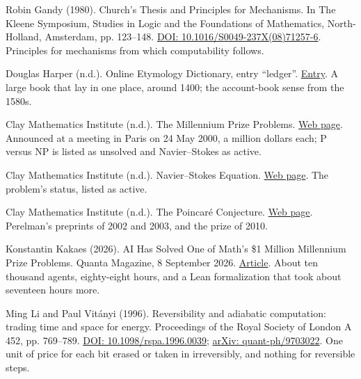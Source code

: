 \noindent Robin Gandy (1980). Church's Thesis and Principles for Mechanisms. In The Kleene Symposium, Studies in Logic and the Foundations of Mathematics, North-Holland, Amsterdam, pp. 123--148. \href{https://doi.org/10.1016/S0049-237X(08)71257-6}{DOI: 10.1016/S0049-237X(08)71257-6}. Principles for mechanisms from which computability follows.
\par\medskip

\noindent Douglas Harper (n.d.). Online Etymology Dictionary, entry ``ledger''. \href{https://www.etymonline.com/word/ledger}{Entry}. A large book that lay in one place, around 1400; the account-book sense from the 1580s.
\par\medskip

\noindent Clay Mathematics Institute (n.d.). The Millennium Prize Problems. \href{https://www.claymath.org/millennium-problems/}{Web page}. Announced at a meeting in Paris on 24 May 2000, a million dollars each; P versus NP is listed as unsolved and Navier--Stokes as active.
\par\medskip

\noindent Clay Mathematics Institute (n.d.). Navier--Stokes Equation. \href{https://www.claymath.org/millennium/navier-stokes-equation/}{Web page}. The problem's status, listed as active.
\par\medskip

\noindent Clay Mathematics Institute (n.d.). The Poincar\'e Conjecture. \href{https://www.claymath.org/millennium/poincare-conjecture/}{Web page}. Perelman's preprints of 2002 and 2003, and the prize of 2010.
\par\medskip

\noindent Konstantin Kakaes (2026). AI Has Solved One of Math's \$1 Million Millennium Prize Problems. Quanta Magazine, 8 September 2026. \href{https://www.quantamagazine.org/ai-has-solved-one-of-maths-1-million-millennium-prize-problems-20260908/}{Article}. About ten thousand agents, eighty-eight hours, and a Lean formalization that took about seventeen hours more.
\par\medskip

\noindent Ming Li and Paul Vit\'anyi (1996). Reversibility and adiabatic computation: trading time and space for energy. Proceedings of the Royal Society of London A 452, pp. 769--789. \href{https://doi.org/10.1098/rspa.1996.0039}{DOI: 10.1098/rspa.1996.0039}; \href{https://arxiv.org/abs/quant-ph/9703022}{arXiv: quant-ph/9703022}. One unit of price for each bit erased or taken in irreversibly, and nothing for reversible steps.
\par\medskip

